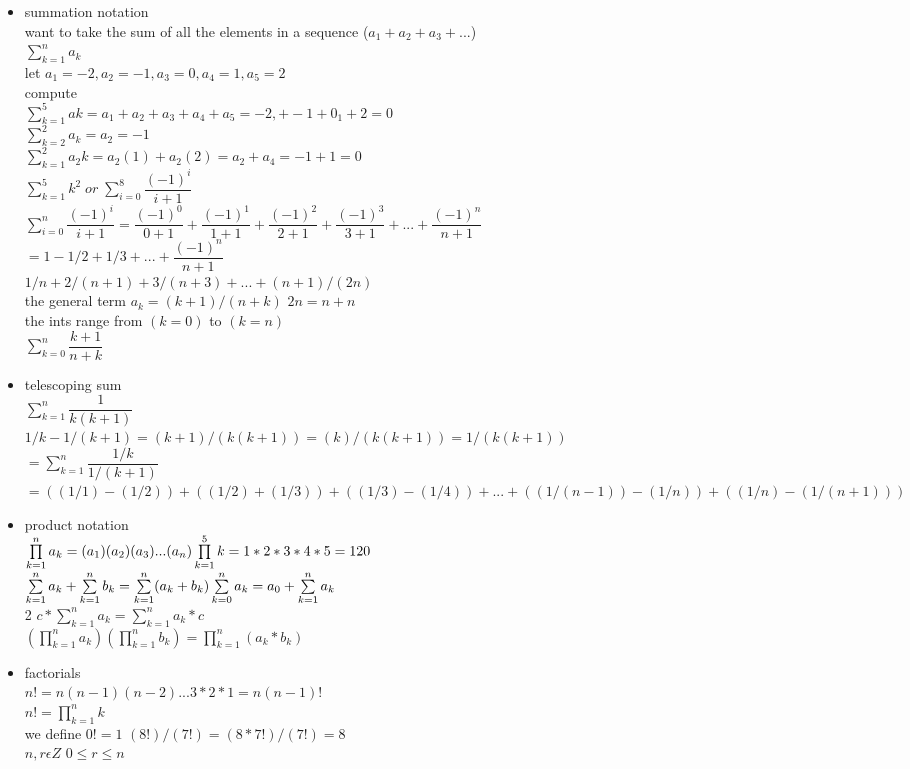 \documentclass[10pt,letterpaper]{report}
\begin{document}
\begin{itemize}
\item summation notation \\ want  to take the sum of all the elements in a sequence ($ a_1 + a_2 + a_3 + ...$)  \\ $\sum\limits_{ k=1}^n a_k $ \\ let $ a_1 = -2 , a_2 = -1 , a_3 = 0 , a_4 =1 , a_5 = 2 $ \\ compute \\ $ \sum\limits_{ k = 1}^5 ak = a_1 + a_2 + a_3 + a_4+a_5 = -2, + -1 + 0 _ 1 + 2 = 0  $\\ $\sum\limits_{k=2}^2 a_k = a_2 = -1$ \\ $ \sum\limits_{ k=1}^2  a_2k = a_2(1) + a_2(2) = a_2 + a_4 = -1 + 1 = 0 $ \\ $\sum\limits_{k=1}^5 k^2 \; or \; \sum\limits_{i=0}^8 \dfrac{(-1)^i}{i + 1} $ \\ $ \sum\limits_{i=0}^n  \dfrac{(-1)^i}{i+1} = \dfrac{(-1)^0}{0+1}  + \dfrac{(-1)^1}{1+1}  +\dfrac{(-1)^2}{2+1}  +\dfrac{(-1)^3}{3+1}  + ... + \dfrac{(-1)^n}{n+1}  $ \\ $ = 1-1/2+ 1/3+ ... + \dfrac{(-1)^n}{n+1} $ \\ $ 1/n + 2/ (n+1) + 3/ (n+3 ) + ... + (n+1)/ (2n) $\\ the general term $ a_k = (k+1)/(n+k) $   $2n = n+ n$ \\the ints range from $(k=0)$ to $(k=n)$ \\$ \sum\limits_{k=0}^n \dfrac{k+1}{n+k} $
\item telescoping sum \\ $ \sum\limits_{k=1}^n \dfrac{1}{k(k+1)} $ \\ $ 1/k - 1/(k+1) = (k+1)/(k(k+1)) = (k)/(k(k+1)) = 1/(k(k+1))$ \\ $ = \sum\limits_{k=1}^n \dfrac{1/k}{1/(k+1)} $ $= ((1/1)-(1/2)) + ((1/2)+(1/3)) + ((1/3)-(1/4)) + ... + ( (1/(n-1)) -(1/n))+((1/n)-(1/(n+1)))$ 
\item product notation \\ $\prod\limits_{k=1}^n a_k = (a_1)(a_2)(a_3)...(a_n) \\ \prod\limits_{k=1}^5 k = 1*2*3*4*5 =120 $ \\ $ \sum\limits_{k=1}^n a_k +  \sum\limits_{k=1}^n b_k = \sum\limits_{k=1}^n (a_k + b_k) \\ \sum\limits_{k=0}^n a_k = a_0 + \sum\limits_{k=1}^n a_k $ \\ 2  $ c* \sum\limits_{k=1}^n a_k = \sum\limits_{k=1}^n a_k * c $ \\ $(\prod\limits_{k=1}^n a_k )(\prod\limits_{k=1}^n b_k)= \prod\limits_{k=1}^n (a_k * b_k)$
\item factorials \\$n! = n( n-1) (n-2) ... 3 * 2 * 1 = n(n-1)!$ \\ $n!= \prod\limits_{k=1}^n k $ \\ we define $0! =1$ $ (8!)/(7!) = (8*7!)/(7!) = 8 $ \\ $ n,r \epsilon Z $ $0 \leq r \leq n$ 

\end{itemize}
\end{document}
